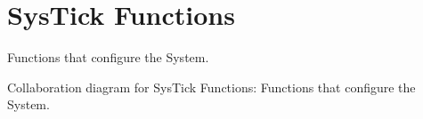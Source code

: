 \hypertarget{group___c_m_s_i_s___core___sys_tick_functions}{}\section{Sys\+Tick Functions}
\label{group___c_m_s_i_s___core___sys_tick_functions}


Functions that configure the System.  


Collaboration diagram for Sys\+Tick Functions\+:
Functions that configure the System. 

